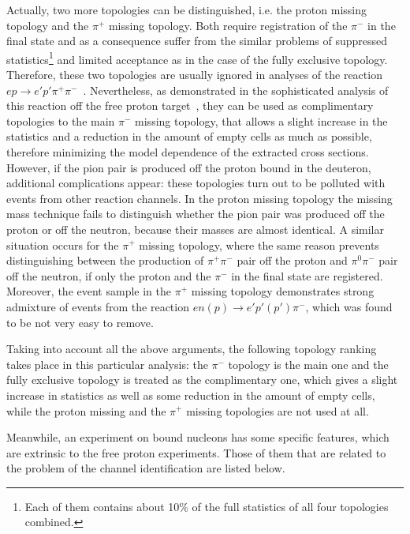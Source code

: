 Actually, two more topologies can be distinguished, i.e. the proton missing topology and the $\pi^{+}$ missing topology. Both require registration of the $\pi^{-}$ in the final state and as a consequence suffer from the similar problems of suppressed statistics\footnote[9]{Each of them contains about 10\% of the full statistics of all four topologies combined.} and limited acceptance as in the case of the fully exclusive topology.  Therefore, these two topologies are usually ignored in analyses of the reaction $ep\rightarrow{}e'p'\pi^{+}\pi^{-}$~\cite{Rip_an_note:2002,Ripani:2002ss,Fed_an_note:2007,Fedotov:2008aa,Isupov:2017lnd}. Nevertheless, as demonstrated in the sophisticated analysis of this reaction off the free proton target~\cite{Fed_an_note:2017,Fed_paper_2018}, they can be used as complimentary topologies to the main $\pi^{-}$ missing topology, that allows a slight increase in the statistics and a reduction in the amount of empty cells as much as possible, therefore minimizing the model dependence of the extracted cross sections. However, if the pion pair is produced off the proton bound in the deuteron, additional complications appear: these topologies turn out to be polluted with events from other reaction channels. In the proton missing topology the missing mass technique fails to distinguish whether the pion pair was produced off the proton or off the neutron, because their masses are almost identical. A similar situation occurs for the $\pi^+$ missing topology, where the same reason prevents distinguishing between the production of $\pi^{+}\pi^{-}$ pair off the proton and $\pi^{0}\pi^{-}$ pair off the neutron, if only the proton and the $\pi^{-}$ in the final state are registered. Moreover, the event sample in the $\pi^+$ missing topology demonstrates strong admixture of events from the reaction $en(p)\rightarrow e'p'(p')\pi^{-}$, which was found to be not very easy to remove.
 
Taking into account all the above arguments, the following topology ranking takes place in this particular analysis: the $\pi^{-}$ topology is the main one and the fully exclusive topology is treated as the complimentary one, which gives a slight increase in statistics as well as some reduction in the amount of empty cells, while the proton missing and the $\pi^{+}$ missing topologies are not used at all.

Meanwhile, an experiment on bound nucleons has some specific features, which are extrinsic to the free proton experiments. Those of them that are related to the problem of the channel identification are listed below.%

